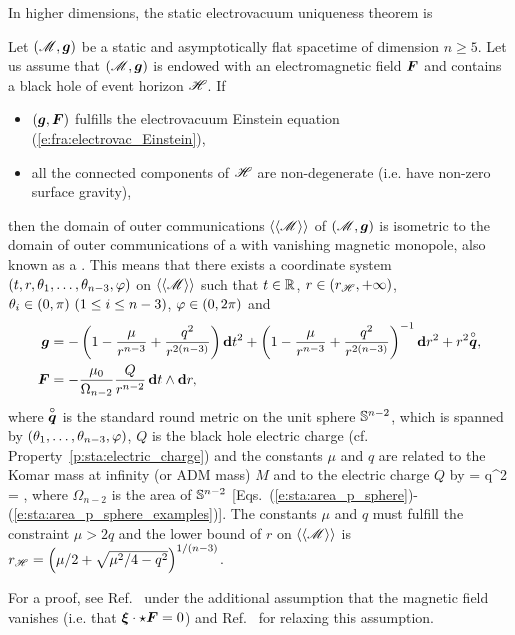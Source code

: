 In higher dimensions, the static electrovacuum uniqueness theorem is

\begin{prop}
\label{p:sta:Israel_uniq_electrovac_n5}
Let $(\mathscr{M},\bm{g})$ be a static and asymptotically flat spacetime of dimension $n\geq 5$.
Let us assume that $(\mathscr{M},\bm{g})$ is
endowed with an electromagnetic field $\bm{F}$ and
contains a black hole of event horizon $\mathscr{H}$. If
\begin{itemize}
\item $(\bm{g},\bm{F})$ fulfills the electrovacuum Einstein equation (\ref{e:fra:electrovac_Einstein}),
\item all the connected components of $\mathscr{H}$ are non-degenerate
(i.e. have non-zero surface gravity),
\end{itemize}
then the domain of outer communications $\langle\langle \mathscr{M}\rangle\rangle$ of $(\mathscr{M},\bm{g})$ is isometric
to the domain of outer communications of a
 with vanishing magnetic monopole, also known as a
.
This means that there exists a coordinate system
$(t,r,\theta_1,\ldots,\theta_{n-3},\varphi)$ on $\langle\langle \mathscr{M}\rangle\rangle$ such that
$t\in\mathbb{R}$, $r\in (r_{\mathscr{H}},+\infty)$, $\theta_i \in (0,\pi)\ (1\leq i \leq n-3)$,
$\varphi\in (0, 2\pi)$ and
\begin{subequations}
\label{e:sta:ReiNorTang}
\begin{align}
    \bm{g} & = - \left( 1 - \frac{\mu}{r^{n-3}} + \frac{q^2}{r^{2(n-3)}} \right) \mathbf{d} t^2
    +  \left( 1 - \frac{\mu}{r^{n-3}} + \frac{q^2}{r^{2(n-3)}}  \right) ^{-1} \mathbf{d} r^2
    + r^2 \overset{\circ}{\bm{q}}, \\
    \bm{F} & = - \frac{\mu_0}{\Omega_{n-2}} \frac{Q}{r^{n-2}} \,  \mathbf{d} t \wedge \mathbf{d} r ,
\end{align}
\end{subequations}
where $\overset{\circ}{\bm{q}}$ is the standard round metric on
the unit sphere $\mathbb{S}^{n-2}$, which is
spanned by $(\theta_1,\ldots,\theta_{n-3},\varphi)$,
$Q$ is the black hole electric charge (cf. Property~\ref{p:sta:electric_charge}) and
the constants $\mu$ and $q$ are related to the Komar mass at infinity (or ADM mass)
$M$ and to the electric charge $Q$ by
\be \label{e:sta:ReiNorTang_mu_q}
    \mu = 
    \qand
    q^2 =  ,
\ee
where $\Omega_{n-2}$ is the area of $\mathbb{S}^{n-2}$
[Eqs.~(\ref{e:sta:area_p_sphere})-(\ref{e:sta:area_p_sphere_examples})].
The constants $\mu$ and $q$ must fulfill the constraint $\mu > 2 q$ and the lower bound
of $r$ on $\langle\langle \mathscr{M}\rangle\rangle$ is
$r_{\mathscr{H}} = \left( \mu/2 + \sqrt{\mu^2/4 - q^2}\right) ^{1/(n-3)}$.
\end{prop}
For a proof, see Ref.~\cite{GibboIS02a} under the additional assumption
that the magnetic field vanishes (i.e. that $\bm{\xi}\cdot\star\bm{F}=0$) and Ref.~\cite{KunduL18} for relaxing this assumption.

